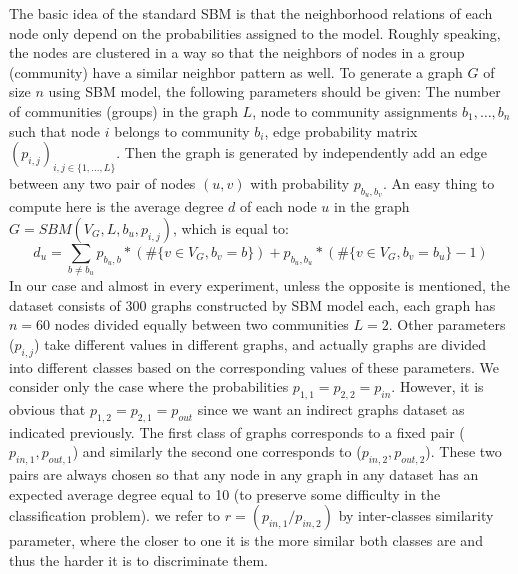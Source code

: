 The basic idea of the standard SBM is that the neighborhood relations of each node only depend on the probabilities assigned to the model. Roughly speaking, the nodes are clustered in a way so that the neighbors of nodes in a group (community) have a similar neighbor pattern as well. To generate a graph $G$ of size $n$ using SBM model, the following parameters should be given: The number of communities (groups) in the graph $L$, node to community assignments ${b_1 , \ldots ,b_n}$ such that node $i$ belongs to community $b_i$, edge probability matrix $(p_{i,j})_{i,j\in\{1,\ldots, L\}}$.
Then the graph is generated by independently add an edge between any two pair of nodes $(u,v)$ with probability $p_{b_u , b_v}$.\newline
An easy thing to compute here is the average degree $d$ of each node $u$ in the graph $G=SBM(V_G, L, b_u, p_{i,j})$, which is equal to:
\begin{equation}
    d_u=\sum_{b\neq b_u} p_{b_u,b}*(\#\{v\in V_G, b_v=b \} )+p_{b_u,b_u}*(\#\{v\in V_G, b_v=b_u \}-1 )
\end{equation}
In our case and almost in every experiment, unless the opposite is mentioned, the dataset consists of 300 graphs constructed by SBM model each, each graph has $n=60$ nodes divided equally between two communities $L=2$. Other parameters ($p_{i,j}$) take different values in different graphs, and actually graphs are divided into different classes based on the corresponding values of these parameters. We consider only the case where the probabilities $p_{1,1}= p_{2,2} = p_{in}$. However,  it is obvious that  $p_{1,2}=p_{2,1}=p_{out}$ since we want an indirect graphs dataset as indicated previously.\newline
The first class of graphs corresponds to a fixed pair ($p_{in,1}, p_{out,1}$) and similarly the second one  corresponds to ($p_{in,2}, p_{out,2}$). These two pairs are always chosen so that any node in any graph in any dataset has an expected average degree equal to 10 (to preserve some difficulty in the classification problem). we refer to $r=(p_{in,1}/p_{in,2})$ by inter-classes similarity parameter, where the closer to one it is the more similar both classes are and thus the harder it is to discriminate them. 

